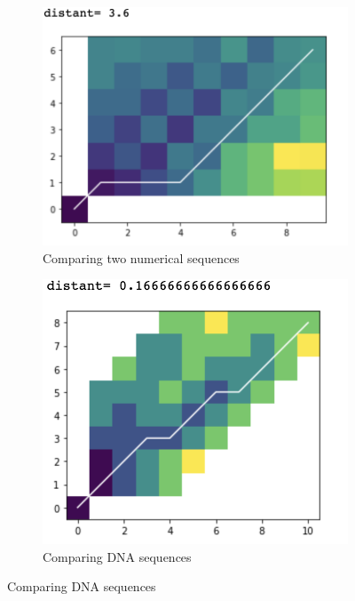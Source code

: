 \documentclass[%
  article,%
  10pt,%
  a4paper,%
  fleqn,%
  oneside,%
  sumario = tradicional,%
  chapter = TITLE,%
  section = TITLE,%
]{abntex2}
\begin{document}
\begin{figure}
\centering
\begin{minipage}[b]{.4\textwidth}
\begin{figure}[H]
  \centering
  \includegraphics[width = \columnwidth]{./Figuras/ex1}
  \caption{Comparing two numerical sequences}
  \label{fig:ex1}
\end{figure}
\end{minipage}\qquad
\begin{minipage}[b]{.4\textwidth}
\begin{figure}[H]
  \centering
  \includegraphics[width = \columnwidth]{./Figuras/ex2}
   \caption{Comparing DNA sequences}
   \label{fig:ex2}
\end{figure}
\end{minipage}
\end{figure}
\end{document}
